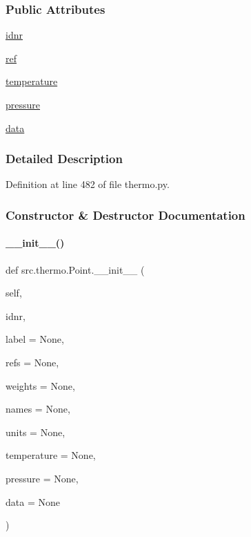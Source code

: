 \subsubsection*{Public Attributes}
\begin{DoxyCompactItemize}
\item 
\hyperlink{classsrc_1_1thermo_1_1Point_ac4fff75295ef24bb94e46b4650ed0705}{idnr}
\item 
\hyperlink{classsrc_1_1thermo_1_1Point_abcf478485471b7f7ad61b7bcd0784e07}{ref}
\item 
\hyperlink{classsrc_1_1thermo_1_1Point_a8f760387fad2b278aa16425b73763df3}{temperature}
\item 
\hyperlink{classsrc_1_1thermo_1_1Point_a0c1946b31c49f730423633f2ebb187a5}{pressure}
\item 
\hyperlink{classsrc_1_1thermo_1_1Point_a26e3c069e4a02a1698c2eb8fd129f14b}{data}
\end{DoxyCompactItemize}


\subsubsection{Detailed Description}


Definition at line 482 of file thermo.\+py.



\subsubsection{Constructor \& Destructor Documentation}
\mbox{\label{classsrc_1_1thermo_1_1Point_ad5886f8b7ed716eeeb8c263674aff5df}} 
\paragraph{\texorpdfstring{\+\_\+\+\_\+init\+\_\+\+\_\+()}{\_\_init\_\_()}}
{\footnotesize\ttfamily def src.\+thermo.\+Point.\+\_\+\+\_\+init\+\_\+\+\_\+ (\begin{DoxyParamCaption}\item[{}]{self,  }\item[{}]{idnr,  }\item[{}]{label = {\ttfamily None},  }\item[{}]{refs = {\ttfamily None},  }\item[{}]{weights = {\ttfamily None},  }\item[{}]{names = {\ttfamily None},  }\item[{}]{units = {\ttfamily None},  }\item[{}]{temperature = {\ttfamily None},  }\item[{}]{pressure = {\ttfamily None},  }\item[{}]{data = {\ttfamily None} }\end{DoxyParamCaption})}



